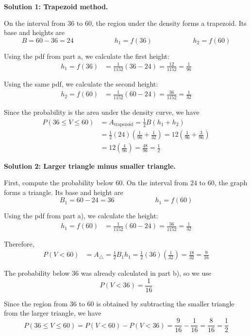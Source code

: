 \textbf{Solution 1: Trapezoid method.}

On the interval from $36$ to $60$, the region under the density forms a trapezoid. Its base and heights are
\[
B=60-36=24
\qquad \qquad \qquad
h_1=f(36)
\qquad \qquad \qquad
h_2=f(60)
\]

Using the pdf from part a, we calculate the first height:
\[
\begin{aligned}
	h_1=f(36)
	&=\frac{1}{1152}(36-24)
	=\frac{12}{1152}
	=\frac{1}{96}
\end{aligned}
\]

Using the same pdf, we calculate the second height:
\[
\begin{aligned}
	h_2=f(60)
	&=\frac{1}{1152}(60-24)
	=\frac{36}{1152}
	=\frac{1}{32}
\end{aligned}
\]

Since the probability is the area under the density curve, we have
\[
\begin{aligned}
	P(36\le V\le 60)
	&=A_{\text{trapezoid}}
	=\frac{1}{2}B(h_1+h_2)\\
	&=\frac{1}{2}(24)\left(\frac{1}{96}+\frac{1}{32}\right)
	=12\left(\frac{1}{96}+\frac{3}{96}\right)\\
	&=12\left(\frac{4}{96}\right)
	=\frac{48}{96}
	=\frac{1}{2}
\end{aligned}
\]

\textbf{Solution 2: Larger triangle minus smaller triangle.}

First, compute the probability below $60$. On the interval from $24$ to $60$, the graph forms a triangle. Its base and height are
\[
B_1=60-24=36
\qquad \qquad \qquad
h_1=f(60)
\]

Using the pdf from part a), we calculate the height:
\[
\begin{aligned}
	h_1=f(60)
	&=\frac{1}{1152}(60-24)
	=\frac{36}{1152}
	=\frac{1}{32}
\end{aligned}
\]

Therefore,
\[
\begin{aligned}
	P(V<60)
	&=A_{\triangle}
	=\frac{1}{2}B_1h_1
	=\frac{1}{2}(36)\left(\frac{1}{32}\right)
	=\frac{18}{32}
	=\frac{9}{16}
\end{aligned}
\]

The probability below $36$ was already calculated in part b), so we use
\[
P(V<36)=\frac{1}{16}
\]

Since the region from $36$ to $60$ is obtained by subtracting the smaller triangle from the larger triangle, we have
\[
P(36\le V\le 60)=P(V<60)-P(V<36)=\frac{9}{16}-\frac{1}{16}
=\frac{8}{16}
=\frac{1}{2}
\]

